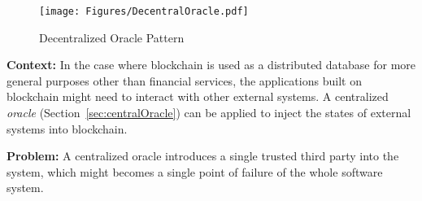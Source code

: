 \begin{figure}[t]
\begin{center}
\texttt{[image: Figures/DecentralOracle.pdf]}
\caption{Decentralized Oracle Pattern}\label{fig:decentraloracle}
\end{center}
\end{figure}

\vspace{0.5em}\noindent \textbf{Context:} 
In the case where blockchain is used as a distributed database for more general purposes other than financial services, the applications built on blockchain might need to interact with other external systems. A centralized \textit{oracle} (Section~\ref{sec:centralOracle}) can be applied to inject the states of external systems into blockchain.  


\vspace{0.5em}\noindent \textbf{Problem:} 
A centralized oracle introduces a single trusted third party into the system, which might becomes a single point of failure of the whole software system.


